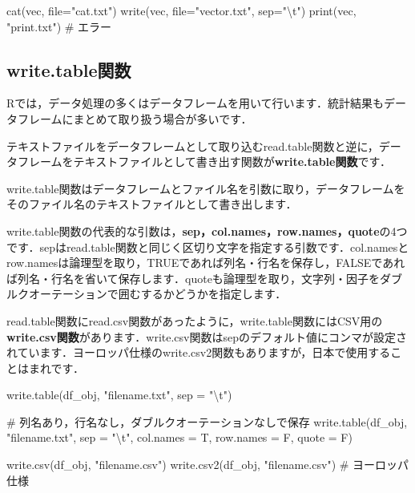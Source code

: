 \documentclass[
  letterpaper,
  DIV=11,
  numbers=noendperiod]{scrreprt}
\newenvironment{Shaded}{\begin{snugshade}}{\end{snugshade}}
\newcommand{\AttributeTok}[1]{\textcolor[rgb]{0.40,0.45,0.13}{#1}}
\newcommand{\CommentTok}[1]{\textcolor[rgb]{0.37,0.37,0.37}{#1}}
\newcommand{\FunctionTok}[1]{\textcolor[rgb]{0.28,0.35,0.67}{#1}}
\newcommand{\NormalTok}[1]{\textcolor[rgb]{0.00,0.23,0.31}{#1}}
\newcommand{\SpecialCharTok}[1]{\textcolor[rgb]{0.37,0.37,0.37}{#1}}
\newcommand{\StringTok}[1]{\textcolor[rgb]{0.13,0.47,0.30}{#1}}
\begin{document}
\begin{Shaded}
\begin{Highlighting}[]
\FunctionTok{cat}\NormalTok{(vec, }\AttributeTok{file=}\StringTok{"cat.txt"}\NormalTok{)}
\FunctionTok{write}\NormalTok{(vec, }\AttributeTok{file=}\StringTok{"vector.txt"}\NormalTok{, }\AttributeTok{sep=}\StringTok{"}\SpecialCharTok{\textbackslash{}t}\StringTok{"}\NormalTok{)}
\FunctionTok{print}\NormalTok{(vec, }\StringTok{"print.txt"}\NormalTok{) }\CommentTok{\# エラー}
\end{Highlighting}
\end{Shaded}

\hypertarget{write.tableux95a2ux6570}{%
\subsection{write.table関数}\label{write.tableux95a2ux6570}}

Rでは，データ処理の多くはデータフレームを用いて行います．統計結果もデータフレームにまとめて取り扱う場合が多いです．

テキストファイルをデータフレームとして取り込むread.table関数と逆に，データフレームをテキストファイルとして書き出す関数が\textbf{write.table関数}です．

write.table関数はデータフレームとファイル名を引数に取り，データフレームをそのファイル名のテキストファイルとして書き出します．

write.table関数の代表的な引数は，\textbf{sep，col.names，row.names，quote}の4つです．sepはread.table関数と同じく区切り文字を指定する引数です．col.namesとrow.namesは論理型を取り，TRUEであれば列名・行名を保存し，FALSEであれば列名・行名を省いて保存します．quoteも論理型を取り，文字列・因子をダブルクオーテーションで囲むするかどうかを指定します．

read.table関数にread.csv関数があったように，write.table関数にはCSV用の\textbf{write.csv関数}があります．write.csv関数はsepのデフォルト値にコンマが設定されています．ヨーロッパ仕様のwrite.csv2関数もありますが，日本で使用することはまれです．

\begin{Shaded}
\begin{Highlighting}[]
\FunctionTok{write.table}\NormalTok{(df\_obj, }\StringTok{"filename.txt"}\NormalTok{, }\AttributeTok{sep =} \StringTok{"}\SpecialCharTok{\textbackslash{}t}\StringTok{"}\NormalTok{)}

\CommentTok{\# 列名あり，行名なし，ダブルクオーテーションなしで保存}
\FunctionTok{write.table}\NormalTok{(df\_obj, }\StringTok{"filename.txt"}\NormalTok{, }\AttributeTok{sep =} \StringTok{"}\SpecialCharTok{\textbackslash{}t}\StringTok{"}\NormalTok{, }\AttributeTok{col.names =}\NormalTok{ T, }\AttributeTok{row.names =}\NormalTok{ F, }\AttributeTok{quote =}\NormalTok{ F) }

\FunctionTok{write.csv}\NormalTok{(df\_obj, }\StringTok{"filename.csv"}\NormalTok{)}
\FunctionTok{write.csv2}\NormalTok{(df\_obj, }\StringTok{"filename.csv"}\NormalTok{) }\CommentTok{\#  ヨーロッパ仕様}
\end{Highlighting}
\end{Shaded}
\end{document}
